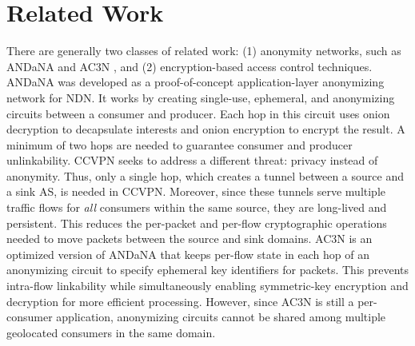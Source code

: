 \section{Related Work} \label{sec:related}

There are generally two classes of related work: (1) anonymity networks, such
as ANDaNA \cite{dibenedetto2011andana} and AC3N \cite{tsudik2016ac3n}, and
(2) encryption-based access control techniques. ANDaNA was developed as a
proof-of-concept application-layer anonymizing network for NDN. It works by
creating single-use, ephemeral, and anonymizing circuits between a consumer
and producer. Each hop in this circuit uses onion decryption to decapsulate
interests and onion encryption to encrypt the result. A minimum of two hops are 
needed to guarantee consumer and producer unlinkability. CCVPN seeks to address
a different threat: privacy instead of anonymity. Thus, only a single hop, which
creates a tunnel between a source and a sink AS, is needed in CCVPN. Moreover,
since these tunnels serve multiple traffic flows for \emph{all} consumers within 
the same source, they are long-lived and persistent. This reduces the per-packet
and per-flow cryptographic operations needed to move packets between the source
and sink domains. AC3N \cite{tsudik2016ac3n} is an optimized version of ANDaNA
that keeps per-flow state in each hop of an anonymizing circuit to specify 
ephemeral key identifiers for packets. This prevents intra-flow linkability
while simultaneously enabling symmetric-key encryption and decryption for more
efficient processing. However, since AC3N is still a per-consumer application,
anonymizing circuits cannot be shared among multiple geolocated consumers
in the same domain. 

